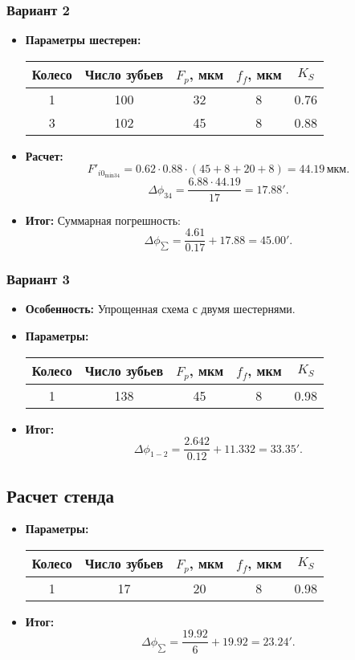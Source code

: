 \subsubsection*{Вариант 2}
\begin{itemize}
    \item \textbf{Параметры шестерен:} 
        \begin{tabular}{|c|c|c|c|c|}
            \hline
            Колесо & Число зубьев & \( F_p \), мкм & \( f_f \), мкм & \( K_S \) \\ \hline
            1 & 100 & 32 & 8 & 0.76 \\ \hline
            3 & 102 & 45 & 8 & 0.88 \\ \hline
        \end{tabular}
    \item \textbf{Расчет:}
        \[
        F'_{i0_{\text{min34}}} = 0.62 \cdot 0.88 \cdot (45 + 8 + 20 + 8) = 44.19 \, \text{мкм}.
        \]
        \[
        \Delta\phi_{34} = \frac{6.88 \cdot 44.19}{17} = 17.88'.
        \]
    \item \textbf{Итог:} Суммарная погрешность:
        \[
        \Delta\phi_{\sum} = \frac{4.61}{0.17} + 17.88 = 45.00'.
        \]
\end{itemize}

\subsubsection*{Вариант 3}
\begin{itemize}
    \item \textbf{Особенность:} Упрощенная схема с двумя шестернями.
    \item \textbf{Параметры:}
        \begin{tabular}{|c|c|c|c|c|}
            \hline
            Колесо & Число зубьев & \( F_p \), мкм & \( f_f \), мкм & \( K_S \) \\ \hline
            1 & 138 & 45 & 8 & 0.98 \\ \hline
        \end{tabular}
    \item \textbf{Итог:} 
        \[
        \Delta\phi_{1-2} = \frac{2.642}{0.12} + 11.332 = 33.35'.
        \]
\end{itemize}

\subsection{Расчет стенда}
\begin{itemize}
    \item \textbf{Параметры:}
        \begin{tabular}{|c|c|c|c|c|}
            \hline
            Колесо & Число зубьев & \( F_p \), мкм & \( f_f \), мкм & \( K_S \) \\ \hline
            1 & 17 & 20 & 8 & 0.98 \\ \hline
        \end{tabular}
    \item \textbf{Итог:}
        \[
        \Delta\phi_{\sum} = \frac{19.92}{6} + 19.92 = 23.24'.
        \]
\end{itemize}

